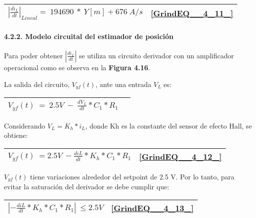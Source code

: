 \noindent 

\begin{tabular}{|p{3.9in}|p{0.4in}|} \hline 
${\left|\frac{{di}_L}{dt}\right|}_{Lineal}=\ 194690\ *\ Y[m]+676\ A/s$ & \eqref{GrindEQ__4_11_}  \\ \hline 
\end{tabular}



\noindent 

\noindent \textbf{}

\noindent 
\paragraph{4.2.2. Modelo circuital del estimador de posici\'{o}n}

\noindent Para poder obtener $\left|\frac{{di}_L}{dt}\right|$ se utiliza un circuito derivador con un amplificador operacional como se observa en la \textbf{Figura 4.16}.


\noindent 

\noindent La salida del circuito, $V_{yf}(t)$, ante una entrada $V_L$ es:

\noindent 

\begin{tabular}{|p{3.9in}|p{0.4in}|} \hline 
$V_{yf}(t)\ =\ 2.5V\ -\ \frac{dV_L}{dt}*C_1*R_1$\textbf{} &   \\ \hline 
\end{tabular}



\noindent Considerando $V_L=K_h*i_L$, donde Kh es la constante del sensor de efecto Hall, se obtiene: 

\noindent 

\begin{tabular}{|p{3.9in}|p{0.4in}|} \hline 
$V_{yf}(t)\ =2.5V\ -\frac{diL}{dt}*K_h*C_1*R_1$\textbf{} & \eqref{GrindEQ__4_12_} \\ \hline 
\end{tabular}



\noindent $V_{yf}(t)$ tiene variaciones alrededor del setpoint de 2.5 V. Por lo tanto, para evitar la saturaci\'{o}n del derivador se debe cumplir que:

\noindent 

\begin{tabular}{|p{3.9in}|p{0.4in}|} \hline 
$\left|-\frac{diL}{dt}*K_h*C_1*R_1\right|\ \le 2.5V$ & \eqref{GrindEQ__4_13_} \\ \hline 
\end{tabular}




